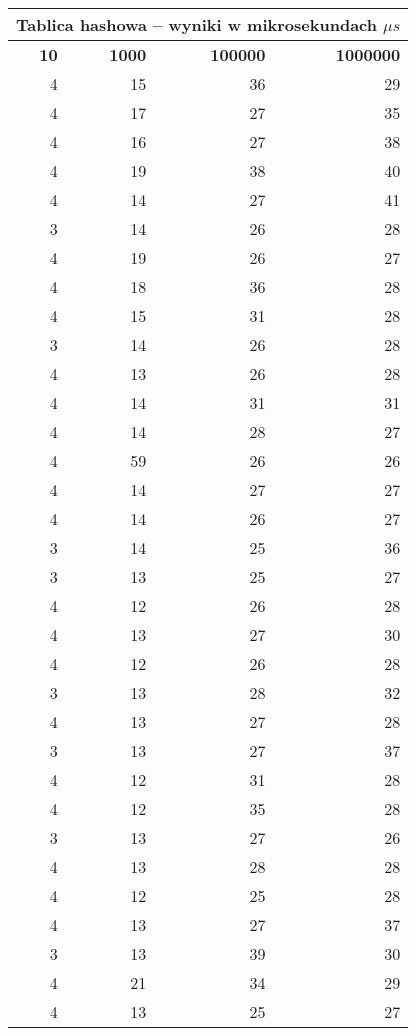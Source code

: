 \documentclass[11pt,a4paper]{article}
\begin{document}
\begin{table}[htbp]
\caption{}
\begin{center}
\begin{tabular}{|r|r|r|r|}
\hline
\multicolumn{ 4}{|c|}{\textbf{Tablica hashowa – wyniki w mikrosekundach $\mu s$}} \\ \hline
\textbf{10} & \textbf{1000} & \textbf{100000} & \textbf{1000000} \\ \hline
4 & 15 & 36 & 29 \\ \hline
4 & 17 & 27 & 35 \\ \hline
4 & 16 & 27 & 38 \\ \hline
4 & 19 & 38 & 40 \\ \hline
4 & 14 & 27 & 41 \\ \hline
3 & 14 & 26 & 28 \\ \hline
4 & 19 & 26 & 27 \\ \hline
4 & 18 & 36 & 28 \\ \hline
4 & 15 & 31 & 28 \\ \hline
3 & 14 & 26 & 28 \\ \hline
4 & 13 & 26 & 28 \\ \hline
4 & 14 & 31 & 31 \\ \hline
4 & 14 & 28 & 27 \\ \hline
4 & 59 & 26 & 26 \\ \hline
4 & 14 & 27 & 27 \\ \hline
4 & 14 & 26 & 27 \\ \hline
3 & 14 & 25 & 36 \\ \hline
3 & 13 & 25 & 27 \\ \hline
4 & 12 & 26 & 28 \\ \hline
4 & 13 & 27 & 30 \\ \hline
4 & 12 & 26 & 28 \\ \hline
3 & 13 & 28 & 32 \\ \hline
4 & 13 & 27 & 28 \\ \hline
3 & 13 & 27 & 37 \\ \hline
4 & 12 & 31 & 28 \\ \hline
4 & 12 & 35 & 28 \\ \hline
3 & 13 & 27 & 26 \\ \hline
4 & 13 & 28 & 28 \\ \hline
4 & 12 & 25 & 28 \\ \hline
4 & 13 & 27 & 37 \\ \hline
3 & 13 & 39 & 30 \\ \hline
4 & 21 & 34 & 29 \\ \hline
4 & 13 & 25 & 27 \\ \hline

\end{tabular}
\end{center}
\end{table}
\end{document}
